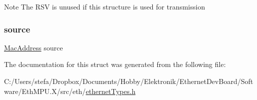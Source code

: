 \begin{DoxyNote}{Note}
The R\+SV is unused if this structure is used for transmission 
\end{DoxyNote}
\mbox{\label{structethernet_frame__t_ad921b9c440e49b18b551c1c6bda03dcc}} 
\subsubsection{\texorpdfstring{source}{source}}
{\footnotesize\ttfamily \mbox{\hyperlink{ethernet_types_8h_ae4e06476597d217d540a5e2b2d699649}{Mac\+Address}} source}



The documentation for this struct was generated from the following file\+:\begin{DoxyCompactItemize}
\item 
C\+:/\+Users/stefa/\+Dropbox/\+Documents/\+Hobby/\+Elektronik/\+Ethernet\+Dev\+Board/\+Software/\+Eth\+M\+P\+U.\+X/src/eth/\mbox{\hyperlink{ethernet_types_8h}{ethernet\+Types.\+h}}\end{DoxyCompactItemize}
